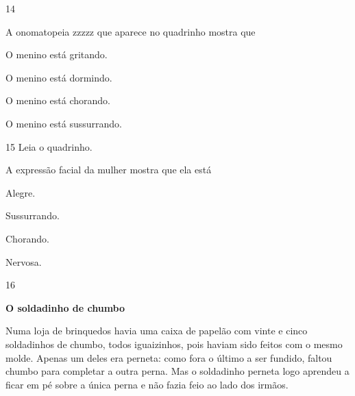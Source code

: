 \num{14}


A onomatopeia zzzzz que aparece no quadrinho mostra que

\begin{escolha}
\item O menino está gritando.

\item O menino está dormindo.

\item O menino está chorando.

\item O menino está sussurrando.
\end{escolha}

\num{15} Leia o quadrinho.


A expressão facial da mulher mostra que ela está

\begin{escolha}
\item Alegre.

\item Sussurrando.

\item Chorando.

\item Nervosa.
\end{escolha}

\num{16}

\textbf{O soldadinho de chumbo}

Numa loja de brinquedos havia uma caixa de papelão com
vinte e cinco soldadinhos de chumbo, todos iguaizinhos, pois
haviam sido feitos com o mesmo molde. Apenas um deles
era perneta: como fora o último a ser fundido, faltou chumbo
para completar a outra perna. Mas o soldadinho perneta logo
aprendeu a ficar em pé sobre a única perna e não fazia feio ao
lado dos irmãos.


